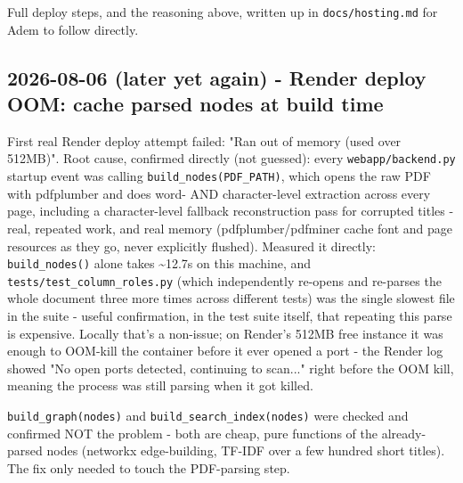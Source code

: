 Full deploy steps, and the reasoning above, written up in \texttt{docs/\allowbreak{}hosting.md} for Adem to follow directly.

\subsection*{2026-08-06 (later yet again) - Render deploy OOM: cache parsed nodes at build time}
First real Render deploy attempt failed: "Ran out of memory (used over 512MB)". Root cause, confirmed directly (not guessed): every \texttt{webapp/\allowbreak{}backend.py} startup event was calling \texttt{build\_\allowbreak{}nodes(PDF\_\allowbreak{}PATH)}, which opens the raw PDF with pdfplumber and does word- AND character-level extraction across every page, including a character-level fallback reconstruction pass for corrupted titles -real, repeated work, and real memory (pdfplumber/pdfminer cache font and page resources as they go, never explicitly flushed). Measured it directly: \texttt{build\_\allowbreak{}nodes()} alone takes \textasciitilde{}12.7s on this machine, and \texttt{tests/\allowbreak{}test\_\allowbreak{}column\_\allowbreak{}roles.py} (which independently re-opens and re-parses the whole document three more times across different tests) was the single slowest file in the suite - useful confirmation, in the test suite itself, that repeating this parse is expensive. Locally that's a non-issue; on Render's 512MB free instance it was enough to OOM-kill the container before it ever opened a port - the Render log showed "No open ports detected, continuing to scan..." right before the OOM kill, meaning the process was still parsing when it got killed.

\texttt{build\_\allowbreak{}graph(nodes)} and \texttt{build\_\allowbreak{}search\_\allowbreak{}index(nodes)} were checked and confirmed NOT the problem - both are cheap, pure functions of the already-parsed nodes (networkx edge-building, TF-IDF over a few hundred short titles). The fix only needed to touch the PDF-parsing step.

